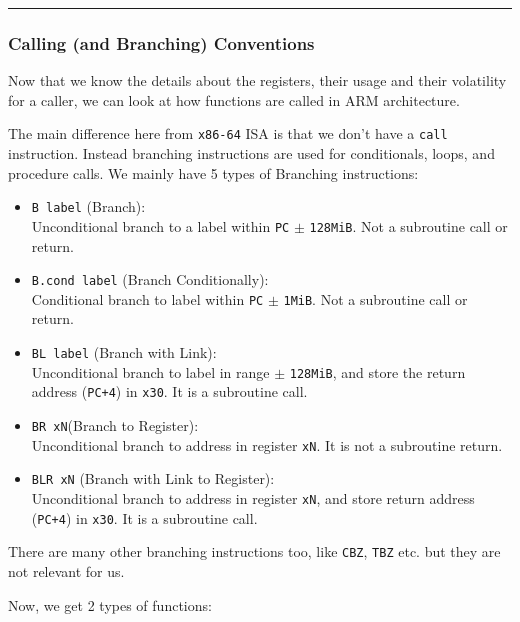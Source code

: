 \documentclass[a4paper, nobind]{templates/ociamthesis}
\providecommand{\tightlist}{%
  \setlength{\itemsep}{0pt}\setlength{\parskip}{0pt}}
\begin{document}
\begin{center}\rule{0.5\linewidth}{0.5pt}\end{center}

\subsubsection{Calling (and Branching) Conventions}\label{calling-and-branching-conventions}

Now that we know the details about the registers, their usage and their volatility for a caller,
we can look at how functions are called in ARM architecture.

The main difference here from \texttt{x86-64} ISA is that we don't have a \texttt{call} instruction.
Instead branching instructions are used for conditionals, loops, and procedure calls.
We mainly have 5 types of Branching instructions:

\begin{itemize}
\tightlist
\item
  \texttt{B\ label} (Branch):\\
  Unconditional branch to a label within \texttt{PC} \(\pm\) \texttt{128MiB}.
  Not a subroutine call or return.
\item
  \texttt{B.cond\ label} (Branch Conditionally):\\
  Conditional branch to label within \texttt{PC} \(\pm\) \texttt{1MiB}.
  Not a subroutine call or return.
\item
  \texttt{BL\ label} (Branch with Link):\\
  Unconditional branch to label in range \(\pm\) \texttt{128MiB},
  and store the return address (\texttt{PC+4}) in \texttt{x30}.
  It is a subroutine call.
\item
  \texttt{BR\ xN}(Branch to Register):\\
  Unconditional branch to address in register \texttt{xN}.
  It is not a subroutine return.
\item
  \texttt{BLR\ xN} (Branch with Link to Register):\\
  Unconditional branch to address in register \texttt{xN},
  and store return address (\texttt{PC+4}) in \texttt{x30}.
  It is a subroutine call.
\end{itemize}

There are many other branching instructions too, like \texttt{CBZ}, \texttt{TBZ} etc.
but they are not relevant for us.

Now, we get 2 types of functions:
\end{document}
